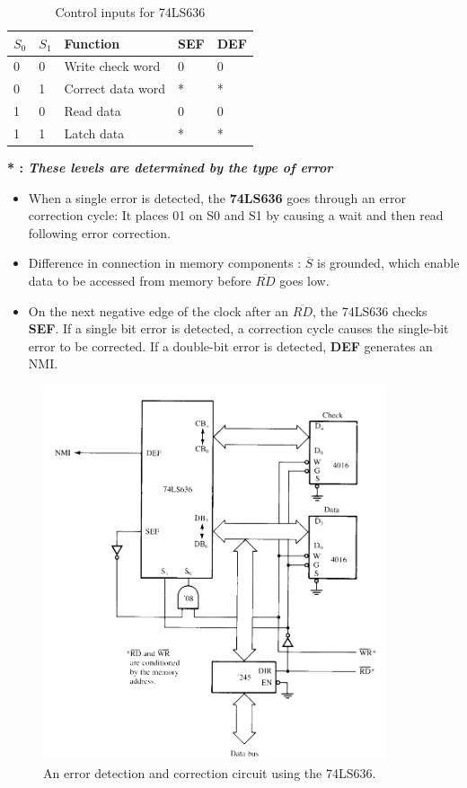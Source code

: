 \begin{table}[h!]
\centering
\begin{tabular}{ |p{1cm}|p{1cm}|p{3cm}|p{1cm}|p{1cm}| }
\hline
$S_0$ & $S_1$ & Function & SEF & DEF\\
\hline
0 & 0 & Write check word  & 0 & 0\\
\rowcolor{cyan} 0 & 1 & Correct data word & * & *\\
1 & 0 & Read data         & 0 & 0\\
1 & 1 & Latch data        & * & *\\

\hline
\end{tabular}

\caption{Control inputs for 74LS636}
\label{table:9}
\end{table}
\textbf{* : \textit{These levels are determined by the type of error}}
\begin{itemize}
  \item When a single error is detected, the \textbf{74LS636} goes through an error correction cycle: \newline
  It places 01 on S0 and S1 by causing a wait and then read following error correction.
  \item Difference in connection in memory components :\newline
  $\overline{S}$ is grounded, which enable data to be accessed from memory before $\overline{RD}$ goes low.
  \item On the next negative edge of the clock after an $\overline{RD}$, the 74LS636 checks \textbf{SEF}. If a single bit error is detected, a correction cycle causes the single-bit error to be corrected. If a double-bit error is detected, \textbf{DEF} generates an NMI.
\end{itemize}
\begin{figure}[h!]
  \includegraphics[width = 0.9\textwidth]{./figures/Error_Correction.png}
  \caption{An error detection and correction circuit using the 74LS636.}
  \label{}
\end{figure}
